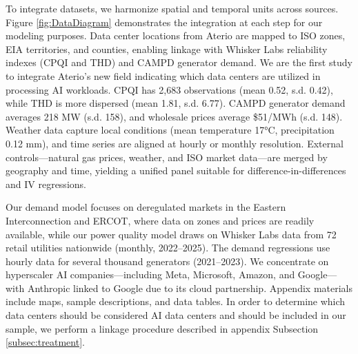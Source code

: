 \documentclass[sigconf,authordraft]{acmart}
\begin{document}
To integrate datasets, we harmonize spatial and temporal units across sources. Figure \ref{fig:DataDiagram} demonstrates the integration at each step for our modeling purposes. Data center locations from Aterio are mapped to ISO zones, EIA territories, and counties, enabling linkage with Whisker Labs reliability indexes (CPQI and THD) and CAMPD generator demand. We are the first study to integrate Aterio’s new field indicating which data centers are utilized in processing AI workloads. CPQI has 2,683 observations (mean 0.52, s.d. 0.42), while THD is more dispersed (mean 1.81, s.d. 6.77). CAMPD generator demand averages 218 MW (s.d. 158), and wholesale prices average \$51/MWh (s.d. 148). Weather data capture local conditions (mean temperature 17°C, precipitation 0.12 mm), and time series are aligned at hourly or monthly resolution. External controls—natural gas prices, weather, and ISO market data—are merged by geography and time, yielding a unified panel suitable for difference-in-differences and IV regressions.

Our demand model focuses on deregulated markets in the Eastern Interconnection and ERCOT, where data on zones and prices are readily available, while our power quality model draws on Whisker Labs data from 72 retail utilities nationwide (monthly, 2022–2025). The demand regressions use hourly data for several thousand generators (2021–2023). We concentrate on hyperscaler AI companies—including Meta, Microsoft, Amazon, and Google—with Anthropic linked to Google due to its cloud partnership. Appendix materials include maps, sample descriptions, and data tables. In order to determine which data centers should be considered AI data centers and should be included in our sample, we perform a linkage procedure described in appendix Subsection \ref{subsec:treatment}.
\end{document}
